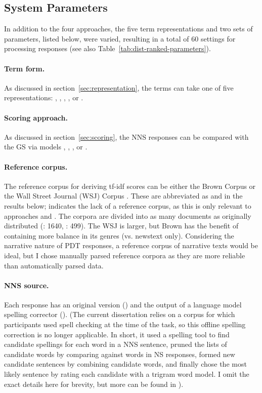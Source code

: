 \subsection{System Parameters}
\label{sec:parameters}

In addition to the four approaches, the five term representations and
two sets of parameters, listed below, were varied, resulting in a total of
60 settings for processing responses (see also
Table~\ref{tab:dist-ranked-parameters}). 

\paragraph{Term form.} As discussed in
section~\ref{sec:representation}, the terms can take one of five
representations: , , , ,
or .

\paragraph{Scoring approach.} As discussed in
section~\ref{sec:scoring}, the NNS responses can be
compared with the GS via models , , , or .

\paragraph{Reference corpus.} The reference corpus for deriving tf-idf
scores can be either the Brown Corpus \citep{kucera:francis:67} or the
Wall Street Journal (WSJ) Corpus \citep{marcus-et-al:93}. These are
abbreviated as  and  in the results
below;  indicates the lack of a reference corpus, as this is
only relevant to approaches  and
. The corpora are divided into as many documents as
originally distributed (: 1640, : 499). The WSJ is
larger, but Brown has the benefit of containing more balance in its
genres (vs. newstext only). Considering the narrative nature of PDT
responses, a reference corpus of narrative texts would be ideal, but
I chose manually parsed reference corpora as they are more reliable
than automatically parsed data.

\paragraph{NNS source.} Each response has an original version
() and the output of a language model spelling corrector
(). (The current dissertation relies on a corpus for which participants used spell checking at the time of the task, so this offline spelling correction is no longer applicable. In short, it used a spelling tool to find candidate spellings for each word in a NNS sentence, pruned the lists of candidate words by comparing against words in NS responses, formed new candidate sentences by combining candidate words, and finally chose the most likely sentence by rating each candidate with a trigram word model. I omit the exact details here for brevity, but more can be found in \cite{king:dickinson:14}).

